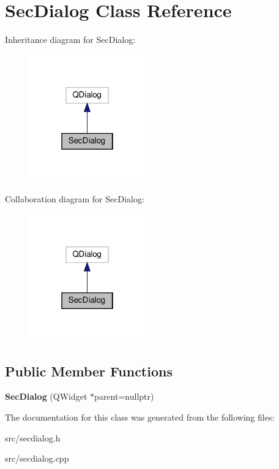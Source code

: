 \hypertarget{classSecDialog}{}\section{Sec\+Dialog Class Reference}
\label{classSecDialog}


Inheritance diagram for Sec\+Dialog\+:\nopagebreak
\begin{figure}[H]
\begin{center}
\leavevmode
\includegraphics[width=142pt]{classSecDialog__inherit__graph}
\end{center}
\end{figure}


Collaboration diagram for Sec\+Dialog\+:\nopagebreak
\begin{figure}[H]
\begin{center}
\leavevmode
\includegraphics[width=142pt]{classSecDialog__coll__graph}
\end{center}
\end{figure}
\subsection*{Public Member Functions}
\begin{DoxyCompactItemize}
\item 
\mbox{\label{classSecDialog_a09f0471b5ec6ac7126a2c65d700ff7b5}} 
{\bfseries Sec\+Dialog} (Q\+Widget $\ast$parent=nullptr)
\end{DoxyCompactItemize}


The documentation for this class was generated from the following files\+:\begin{DoxyCompactItemize}
\item 
src/secdialog.\+h\item 
src/secdialog.\+cpp\end{DoxyCompactItemize}
